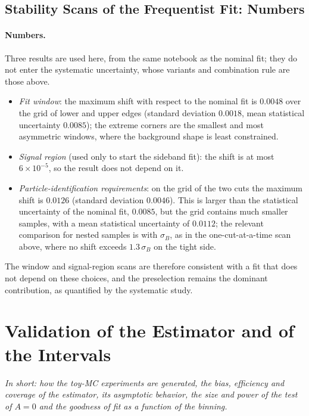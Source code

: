 \subsection{Stability Scans of the Frequentist Fit: Numbers}
\paragraph*{Numbers.} Three results are used here, from the same notebook as the nominal fit; they do not enter the systematic uncertainty, whose variants and combination rule are those above.
\begin{itemize}[leftmargin=*,itemsep=1pt]
\item \emph{Fit window}: the maximum shift with respect to the nominal fit is $0.0048$ over the grid of lower and upper edges (standard deviation $0.0018$, mean statistical uncertainty $0.0085$); the extreme corners are the smallest and most asymmetric windows, where the background shape is least constrained.
\item \emph{Signal region} (used only to start the sideband fit): the shift is at most $6\times10^{-5}$, so the result does not depend on it.
\item \emph{Particle-identification requirements}: on the grid of the two cuts the maximum shift is $0.0126$ (standard deviation $0.0046$). This is larger than the statistical uncertainty of the nominal fit, $0.0085$, but the grid contains much smaller samples, with a mean statistical uncertainty of $0.0112$; the relevant comparison for nested samples is with $\sigma_B$, as in the one-cut-at-a-time scan above, where no shift exceeds $1.3\,\sigma_B$ on the tight side.
\end{itemize}
The window and signal-region scans are therefore consistent with a fit that does not depend on these choices, and the preselection remains the dominant contribution, as quantified by the systematic study.

\FloatBarrier

\section{Validation of the Estimator and of the Intervals}
\label{app:ext_valid}
\label{sec:appendix_checks}
\emph{In short: how the toy-MC experiments are generated, the bias, efficiency and coverage of the estimator, its asymptotic behavior, the size and power of the test of $A=0$ and the goodness of fit as a function of the binning.}

